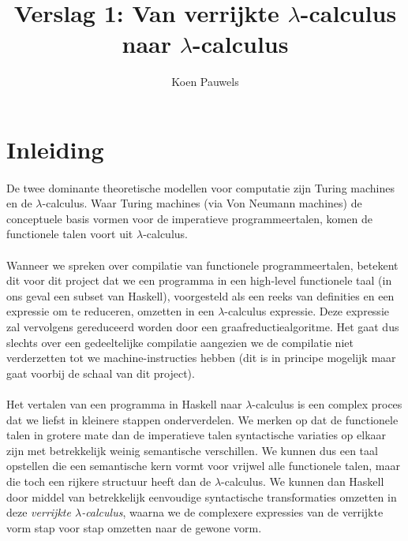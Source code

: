 \documentclass[a4paper,10pt]{article}
\begin{document}
\lstset{language=Haskell}
\title{Verslag 1: Van verrijkte $\lambda$-calculus naar $\lambda$-calculus}
\author{Koen Pauwels}
\maketitle

\section{Inleiding}
\paragraph{}
De twee dominante theoretische modellen voor computatie zijn Turing machines en de $\lambda$-calculus.
Waar Turing machines (via Von Neumann machines) de conceptuele basis vormen voor de imperatieve programmeertalen, komen de functionele talen voort uit $\lambda$-calculus.

\paragraph{}
Wanneer we spreken over compilatie van functionele programmeertalen, betekent dit voor dit project dat we een programma in een high-level functionele taal (in ons geval een subset van Haskell), voorgesteld als een reeks van definities en een expressie om te reduceren, omzetten in een $\lambda$-calculus expressie.
Deze expressie zal vervolgens gereduceerd worden door een graafreductiealgoritme.
Het gaat dus slechts over een gedeeltelijke compilatie aangezien we de compilatie niet verderzetten tot we machine-instructies hebben (dit is in principe mogelijk maar gaat voorbij de schaal van dit project).

\paragraph{}
Het vertalen van een programma in Haskell naar $\lambda$-calculus is een complex proces dat we liefst in kleinere stappen onderverdelen.
We merken op dat de functionele talen in grotere mate dan de imperatieve talen syntactische variaties op elkaar zijn met betrekkelijk weinig semantische verschillen.
We kunnen dus een taal opstellen die een semantische kern vormt voor vrijwel alle functionele talen, maar die toch een rijkere structuur heeft dan de $\lambda$-calculus.
We kunnen dan Haskell door middel van betrekkelijk eenvoudige syntactische transformaties omzetten in deze \emph{verrijkte $\lambda$-calculus}, waarna we de complexere expressies van de verrijkte vorm stap voor stap omzetten naar de gewone vorm.
\end{document}
